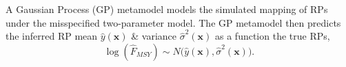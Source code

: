 \documentclass[a0paper,portrait]{baposter}
\begin{document}
\begin{poster}
{	%


	A Gaussian Process (GP) metamodel models the simulated mapping of RPs under the 
	misspecified two-parameter model. The GP metamodel then predicts the inferred RP mean $\hat y(\textbf{x})$ \& variance $\hat \sigma^2(\textbf{x})$ as a function the true RPs,
	\vspace{-0.25cm}
        \begin{equation*}
        \log(\hat{F}_{MSY}) \sim N\Big(\hat y(\textbf{x}), \hat \sigma^2(\textbf{x})\Big).
        \end{equation*}



	
}


\end{poster}
\end{document}
